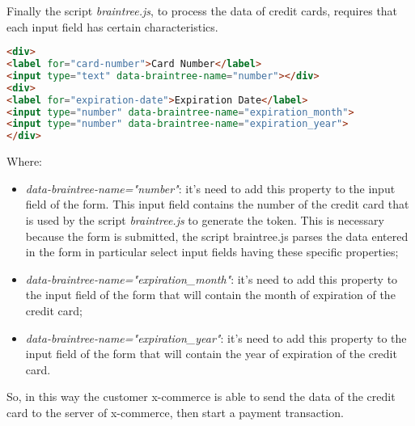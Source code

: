 Finally the script \emph{braintree.js}, to process the data of credit cards, requires that each input field has certain characteristics.
\begin{lstlisting}[language=html]
<div>
<label for="card-number">Card Number</label>
<input type="text" data-braintree-name="number"></div>
<div>
<label for="expiration-date">Expiration Date</label>
<input type="number" data-braintree-name="expiration_month">
<input type="number" data-braintree-name="expiration_year">
</div>
\end{lstlisting}
Where:
\begin{itemize}
\item \emph{data-braintree-name="number"}: it's need to add this property to the input field of the form. This input field contains the number of the credit card that is used by the script \emph{braintree.js} to generate the token. This is necessary because the form is submitted, the script braintree.js parses the data entered in the form in particular select input fields having these specific properties;
\item \emph{data-braintree-name="expiration\_month"}: it's need to add this property to the input field of the form that will contain the month of expiration of the credit card;
\item \emph{data-braintree-name="expiration\_year"}: it's need to add this property to the input field of the form that will contain the year of expiration of the credit card.
\end{itemize}
So, in this way the customer x-commerce is able to send the data of the credit card to the server of x-commerce, then start a payment transaction.
